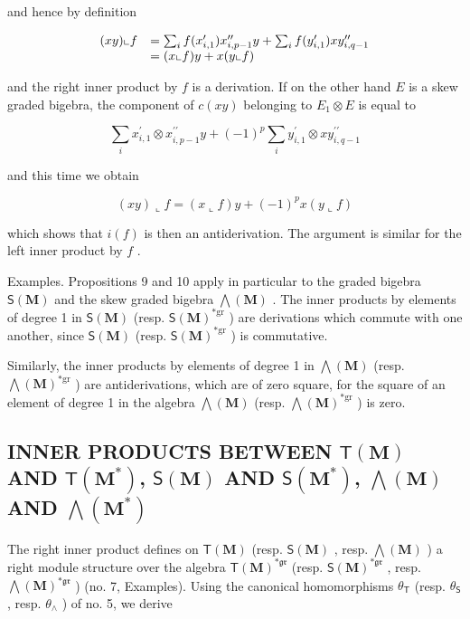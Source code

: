 and hence by definition

\[
\begin{array}{r l} (x y) \llcorner f & = \sum_ {i} f (x _ {i, 1} ^ {\prime}) x _ {i, p - 1} ^ {\prime \prime} y + \sum_ {i} f (y _ {i, 1} ^ {\prime}) x y _ {i, q - 1} ^ {\prime \prime} \\ & = (x \llcorner f) y + x (y \llcorner f) \end{array}
\]

and the right inner product by \(f\) is a derivation. If on the other hand \(E\) is a skew graded bigebra, the component of \(c(xy)\) belonging to \(E_1 \otimes E\) is equal to

\[
\sum_ {i} x _ {i, 1} ^ {\prime} \otimes x _ {i, p - 1} ^ {\prime \prime} y + (- 1) ^ {p} \sum_ {i} y _ {i, 1} ^ {\prime} \otimes x y _ {i, q - 1} ^ {\prime \prime}
\]

and this time we obtain

\[
(x y) \llcorner f = (x \llcorner f) y + (- 1) ^ {p} x (y \llcorner f)
\]

which shows that \(i(f)\) is then an antiderivation. The argument is similar for the left inner product by \(f\) .

Examples. Propositions 9 and 10 apply in particular to the graded bigebra \(\mathsf{S}(\mathbf{M})\) and the skew graded bigebra \(\bigwedge (\mathbf{M})\) . The inner products by elements of degree 1 in \(\mathsf{S}(\mathbf{M})\) (resp. \(\mathsf{S}(\mathbf{M})^{*\mathrm{gr}}\) ) are derivations which commute with one another, since \(\mathsf{S}(\mathbf{M})\) (resp. \(\mathsf{S}(\mathbf{M})^{*\mathrm{gr}}\) ) is commutative.

Similarly, the inner products by elements of degree 1 in \(\bigwedge (\mathbf{M})\) (resp. \(\bigwedge (\mathbf{M})^{*\mathrm{gr}}\) ) are antiderivations, which are of zero square, for the square of an element of degree 1 in the algebra \(\bigwedge (\mathbf{M})\) (resp. \(\bigwedge (\mathbf{M})^{*\mathrm{gr}}\) ) is zero.

\subsection{\texorpdfstring{INNER PRODUCTS BETWEEN \(\mathsf{T}(\mathbf{M})\) AND \(\mathsf{T}(\mathbf{M}^{*})\), \(\mathsf{S}(\mathbf{M})\) AND \(\mathsf{S}(\mathbf{M}^{*})\), \(\bigwedge(\mathbf{M})\) AND \(\bigwedge(\mathbf{M}^{*})\)}{Inner products between T(M) and T(M*), S(M) and S(M*), wedge(M) and wedge(M*)}}

The right inner product defines on \(\mathsf{T}(\mathbf{M})\) (resp. \(\mathsf{S}(\mathbf{M})\) , resp. \(\bigwedge (\mathbf{M})\) ) a right module structure over the algebra \(\mathsf{T}(\mathbf{M})^{*\mathfrak{g}\mathfrak{r}}\) (resp. \(\mathsf{S}(\mathbf{M})^{*\mathfrak{g}\mathfrak{r}}\) , resp. \(\bigwedge (\mathbf{M})^{*\mathfrak{g}\mathfrak{r}}\) ) (no. 7, Examples). Using the canonical homomorphisms \(\theta_{\mathsf{T}}\) (resp. \(\theta_{\mathsf{S}}\) , resp. \(\theta_{\wedge}\) ) of no. 5, we derive

